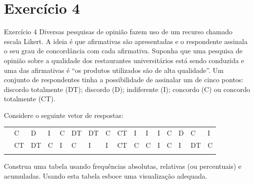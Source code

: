 \documentclass[
  ignorenonframetext,
  serif,
  professionalfont,
  usenames,
  dvipsnames,
  aspectratio = 169]{beamer}
\begin{document}
\section{Exercício 4}\label{exercuxedcio-4}

\begin{frame}{Exercício 4}
\label{exercuxedcio-4-1}
Diversas pesquisas de opinião fazem uso de um recurso chamado escala
Likert. A ideia é que afirmativas são apresentadas e o respondente
assinala o seu grau de concordância com cada afirmativa. Suponha que uma
pesquisa de opinião sobre a qualidade dos restaurantes universitários
está sendo conduzida e uma das afirmativas é ``os produtos utilizados
são de alta qualidade''. Um conjunto de respondentes tinha a
possibilidade de assinalar um de cinco pontos: discordo totalmente (DT);
discordo (D); indiferente (I); concordo (C) ou concordo totalmente (CT).

Considere o seguinte vetor de respostas:

\begin{longtable}[]{@{}llllllllllllllll@{}}
\toprule\noalign{}
\endhead
& C & D & I & C & DT & DT & C & CT & I & I & I & C & D & C & I \\
& CT & DT & C & I & C & I & I & CT & C & C & I & C & I & DT & C \\
\bottomrule\noalign{}
\end{longtable}

Construa uma tabela usando frequências absolutas, relativas (ou
percentuais) e acumuladas. Usando esta tabela esboce uma visualização
adequada.
\end{frame}
\end{document}
